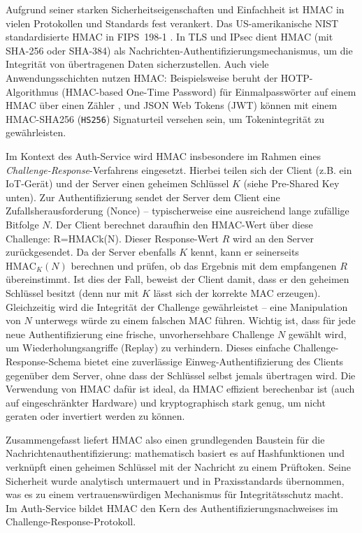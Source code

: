 Aufgrund seiner starken Sicherheitseigenschaften und Einfachheit ist HMAC in vielen Protokollen und Standards fest verankert. Das US-amerikanische NIST standardisierte HMAC in FIPS 198-1 \cite{FIPS198}. In TLS und IPsec dient HMAC (mit SHA-256 oder SHA-384) als Nachrichten-Authentifizierungsmechanismus, um die Integrität von übertragenen Daten sicherzustellen. Auch viele Anwendungsschichten nutzen HMAC: Beispielsweise beruht der HOTP-Algorithmus (HMAC-based One-Time Password) für Einmalpasswörter auf einem HMAC über einen Zähler \cite{RFC4226}, und JSON Web Tokens (JWT) können mit einem HMAC-SHA256 (\texttt{HS256}) Signaturteil versehen sein, um Tokenintegrität zu gewährleisten.

Im Kontext des Auth-Service wird HMAC insbesondere im Rahmen eines \textit{Challenge-Response}-Verfahrens eingesetzt. Hierbei teilen sich der Client (z.B. ein IoT-Gerät) und der Server einen geheimen Schlüssel $K$ (siehe \glqq Pre-Shared Key\grqq{} unten). Zur Authentifizierung sendet der Server dem Client eine Zufallsherausforderung (Nonce) – typischerweise eine ausreichend lange zufällige Bitfolge $N$. Der Client berechnet daraufhin den HMAC-Wert über diese Challenge:
R=HMACk(N). Dieser Response-Wert $R$ wird an den Server zurückgesendet. Da der Server ebenfalls $K$ kennt, kann er seinerseits $\mathrm{HMAC}_K(N)$ berechnen und prüfen, ob das Ergebnis mit dem empfangenen $R$ übereinstimmt. Ist dies der Fall, beweist der Client damit, dass er den geheimen Schlüssel besitzt (denn nur mit $K$ lässt sich der korrekte MAC erzeugen). Gleichzeitig wird die Integrität der Challenge gewährleistet – eine Manipulation von $N$ unterwegs würde zu einem falschen MAC führen. Wichtig ist, dass für jede neue Authentifizierung eine frische, unvorhersehbare Challenge $N$ gewählt wird, um Wiederholungsangriffe (Replay) zu verhindern. Dieses einfache Challenge-Response-Schema bietet eine zuverlässige Einweg-Authentifizierung des Clients gegenüber dem Server, ohne dass der Schlüssel selbst jemals übertragen wird. Die Verwendung von HMAC dafür ist ideal, da HMAC effizient berechenbar ist (auch auf eingeschränkter Hardware) und kryptographisch stark genug, um nicht geraten oder invertiert werden zu können.

Zusammengefasst liefert HMAC also einen grundlegenden Baustein für die Nachrichtenauthentifizierung: mathematisch basiert es auf Hashfunktionen und verknüpft einen geheimen Schlüssel mit der Nachricht zu einem Prüftoken. Seine Sicherheit wurde analytisch untermauert \cite{Krawczyk1997} und in Praxisstandards übernommen, was es zu einem vertrauenswürdigen Mechanismus für Integritätsschutz macht. Im Auth-Service bildet HMAC den Kern des Authentifizierungsnachweises im Challenge-Response-Protokoll.


